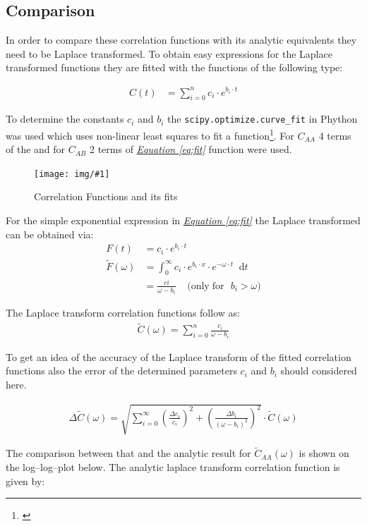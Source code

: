 \documentclass[a4paper, parskip=half]{scrartcl}
\newcommand{\myImage}[2]{
	\begin{figure}[H]
	\centering
	\texttt{[image: img/\#1]}
	\caption{#2}
	\label{pic:#1}
	\end{figure}
}
\newcommand{\diff}{\mathop{}\!\mathrm{d}}
\newcommand{\myEqRef}[1]{\textit{\hyperref[eq:#1]{Equation \ref*{eq:#1}}}}
\newcommand{\myEqLabel}[1]{\label{eq:#1}}
\newcommand{\myCite}[1]{\footnote{\cite{#1} \citeauthor{#1} \citetitle{#1} \citeyear{#1}}}
\begin{document}
\subsection{Comparison}
In order to compare these correlation functions with its analytic equivalents they need to be Laplace transformed. To obtain easy expressions for the Laplace transformed functions they are fitted with the functions of the following type:

\begin{align}
C(t) &= \sum_{i=0}^{n} c_i \cdot e^{b_i \cdot t} \myEqLabel{fit}
\end{align}

To determine the constants $c_i$ and $b_i$ the \verb+scipy.optimize.curve_fit+ in Phython was used which uses non-linear least squares to fit a function\myCite{curvefit}. For $C_{AA}$ 4 terms of the and for $C_{AB}$ 2 terms of \myEqRef{fit} function were used.

\myImage{caa_cab}{Correlation Functions and its fits}

For the simple exponential expression in \myEqRef{fit} the Laplace transformed can be obtained via:
\begin{align}
F(t) &= c_i \cdot e^{b_i \cdot t} \\
\widetilde{F}(\omega) &= \int_0^\infty c_i \cdot e^{b_i\cdot x} \cdot e^{-\omega\cdot t}\diff t \\
&= \frac{ci}{\omega - b_i}\;\;\;\; \mathrm{(only\; for\,\,\,\, } b_i > \omega \mathrm{)} \myEqLabel{laplace}
\end{align}

The Laplace transform correlation functions follow as:
\begin{align}
\widetilde{C}(\omega) = \sum_{i=0}^n \frac{c_i}{\omega - b_i}
\end{align}

To get an idea of the accuracy of the Laplace transform of the fitted correlation functions also the error of the determined parameters $c_i$ and $b_i$ should considered here.

\begin{align}
\Delta\widetilde{C}(\omega) = \sqrt{\sum_{i=0}^\infty \left(\frac{\Delta c_i}{c_i} \right)^2 + \left( \frac{\Delta b_i}{(\omega - b_i)^2}\right)^2} \cdot \widetilde{C}(\omega)
\end{align}

The comparison between that and the analytic result for $\widetilde{C}_{AA}(\omega)$ is shown on the log--log--plot below. The analytic laplace transform correlation function is given by:
\end{document}
